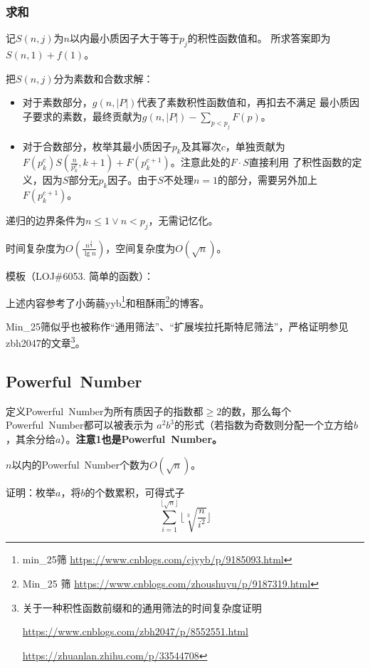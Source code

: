 \subsubsection{求和}
记$S(n,j)$为$n$以内最小质因子大于等于$p_j$的积性函数值和。
所求答案即为$S(n,1)+f(1)$。

把$S(n,j)$分为素数和合数求解：
\begin{itemize}
    \item 对于素数部分，$g(n,|P|)$代表了素数积性函数值和，再扣去不满足
    最小质因子要求的素数，最终贡献为$g(n,|P|)-\displaystyle \sum_{p<p_j}F(p)$。
    \item 对于合数部分，枚举其最小质因子$p_k$及其幂次$c$，单独贡献为\\
    $F(p_k^c)S(\frac{n}{p_k^c},k+1)+F(p_k^{c+1})$。注意此处的$F\cdot S$直接利用
    了积性函数的定义，因为$S$部分无$p_k$因子。由于$S$不处理$n=1$的部分，需要另外加上
    $F(p_k^{c+1})$。
\end{itemize}

递归的边界条件为$n\leq 1 \vee n<p_j$，无需记忆化。

时间复杂度为$O(\frac{n^\frac{3}{4}}{\lg n})$，空间复杂度为$O(\sqrt{n})$。

模板（LOJ\#6053. 简单的函数）：


上述内容参考了小蒟蒻yyb\footnote{
    min\_25筛
    \url{https://www.cnblogs.com/cjyyb/p/9185093.html}
}和租酥雨\footnote{
    Min\_25 筛
    \url{https://www.cnblogs.com/zhoushuyu/p/9187319.html}
}的博客。

Min\_25筛似乎也被称作``通用筛法''、``扩展埃拉托斯特尼筛法''，严格证明参见
zbh2047的文章\footnote{关于一种积性函数前缀和的通用筛法的时间复杂度证明

    \url{https://www.cnblogs.com/zbh2047/p/8552551.html}

    \url{https://zhuanlan.zhihu.com/p/33544708}}。
\subsection{Powerful~Number}
定义Powerful~Number为所有质因子的指数都$\geq 2$的数，那么每个Powerful~Number都可以被表示为
$a^2b^3$的形式（若指数为奇数则分配一个立方给$b$，其余分给$a$）。{\bfseries 注意1也是Powerful~Number。}

\begin{theorem}
    $n$以内的Powerful~Number个数为$O(\sqrt{n})$。
\end{theorem}

证明：枚举$a$，将$b$的个数累积，可得式子
\begin{displaymath}
    \sum_{i=1}^{\lfloor\sqrt{n}\rfloor}{\lfloor\sqrt[3]{\frac{n}{i^2}}\rfloor}
\end{displaymath}

